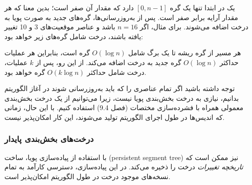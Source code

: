 یک  در ابتدا تنها
یک گره $[0,n-1]$ دارد که مقدار آن صفر است؛
بدین معنا که هر مقدار آرایه برابر صفر است.
پس از به‌روزرسانی‌ها، گره‌های جدید به صورت پویا
به درخت اضافه می‌شوند.
برای مثال، اگر $n=16$ باشد و عناصر
موقعیت‌های 3 و 10 تغییر یافته باشند،
درخت شامل گره‌های زیر خواهد بود:
\begin{center}
\end{center}

هر مسیر از گره ریشه تا یک برگ شامل
$O(\log n)$ گره است،
بنابراین هر عملیات حداکثر $O(\log n)$
گره جدید به درخت اضافه می‌کند.
از این رو، پس از $k$ عملیات، درخت شامل
حداکثر $O(k \log n)$ گره خواهد بود.

توجه داشته باشید اگر تمام عناصری را که باید به‌روزرسانی شوند
در آغاز الگوریتم بدانیم،
نیازی به درخت بخش‌بندی پویا نیست،
زیرا می‌توانیم از یک درخت بخش‌بندی معمولی همراه با
فشرده‌سازی مختصات (فصل 9.4) استفاده کنیم.
با این حال، زمانی که اندیس‌ها در طول اجرای الگوریتم تولید می‌شوند،
این کار امکان‌پذیر نیست.

\subsubsection{درخت‌های بخش‌بندی پایدار}


با استفاده از پیاده‌سازی پویا،
ساخت  (persistent segment tree)
نیز ممکن است که \emph{تاریخچه تغییرات} درخت را ذخیره می‌کند.
در این پیاده‌سازی، دسترسی کارآمد به تمام نسخه‌های موجود درخت
در طول الگوریتم امکان‌پذیر است.

